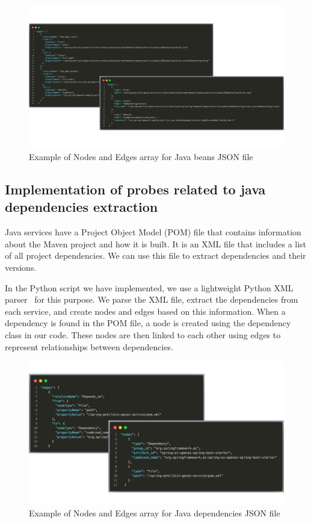 \begin{figure}[H]
    \centering
    \includegraphics[width=1\textwidth]{figures/nodes_edges_example3.png}
    \caption{Example of Nodes and Edges array for Java beans JSON file}
    \label{fig:example_nodes_edges_java_beans}
\end{figure}

\subsection{Implementation of probes related to java dependencies extraction}

Java services have a Project Object Model (POM) file that contains information about the Maven project and how it is built. It is an XML file that includes a list of all project dependencies. We can use this file to extract dependencies and their versions.

In the Python script we have implemented, we use a lightweight Python XML parser~\citep{python-elementtree} for this purpose. We parse the XML file, extract the dependencies from each service, and create nodes and edges based on this information. When a dependency is found in the POM file, a node is created using the dependency class in our code. These nodes are then linked to each other using edges to represent relationships between dependencies.

\begin{figure}[H]
    \centering
    \includegraphics[width=1\textwidth]{figures/nodes_edges_example4.png}
    \caption{Example of Nodes and Edges array for Java dependencies JSON file}
    \label{fig:example_nodes_edges_java_dependencies}
\end{figure}

